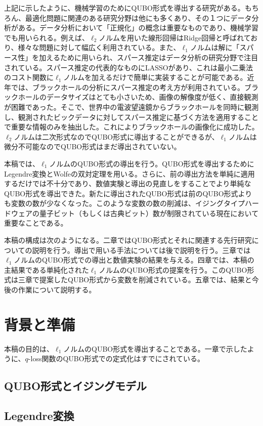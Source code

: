 \documentclass[fp,twocolumn]{jpsj3}
\begin{document}
上記に示したように、機械学習のためにQUBO形式を導出する研究がある。もちろん、最適化問題に関連のある研究分野は他にも多くあり、その１つにデータ分析がある。データ分析において「正規化」の概念は重要なものであり、機械学習でも用いられる。例えば、$\ell_{2}$ノルムを用いた線形回帰はRidge回帰と呼ばれており、様々な問題に対して幅広く利用されている。また、$\ell_{1}$ノルムは解に「スパース性」を加えるために用いられ、スパース推定はデータ分析の研究分野で注目されている。スパース推定の代表的なものにLASSOがあり、これは最小二乗法のコスト関数に$\ell_{1}$ノルムを加えるだけで簡単に実装することが可能である。近年では、ブラックホールの分析にスパース推定の考え方が利用されている。ブラックホールのデータサイズはとても小さいため、画像の解像度が低く、直接観測が困難であった。そこで、世界中の電波望遠鏡からブラックホールを同時に観測し、観測されたビックデータに対してスパース推定に基づく方法を適用することで重要な情報のみを抽出した。これによりブラックホールの画像化に成功した。$\ell_{2}$ノルムは二次形式なのでQUBO形式に導出することができるが、$\ell_{1}$ノルムは微分不可能なのでQUBO形式はまだ導出されていない。

本稿では、$\ell_{1}$ノルムのQUBO形式の導出を行う。QUBO形式を導出するためにLegendre変換とWolfeの双対定理を用いる。さらに、前の導出方法を単純に適用するだけでは不十分であり、数値実験と導出の見直しをすることでより単純なQUBO形式を導出できた。新たに導出されたQUBO形式は前のQUBO形式よりも変数の数が少なくなった。このような変数の数の削減は、イジングタイプハードウェアの量子ビット（もしくは古典ビット）数が制限されている現在において重要なことである。

本稿の構成は次のようになる。二章ではQUBO形式とそれに関連する先行研究についての説明を行う。導出で用いる手法については後で説明を行う。三章では$\ell_{1}$ノルムのQUBO形式での導出と数値実験の結果を与える。四章では、本稿の主結果である単純化された$\ell_{1}$ノルムのQUBO形式の提案を行う。このQUBO形式は三章で提案したQUBO形式から変数を削減されている。五章では、結果と今後の作業について説明する。

\section{背景と準備}
本稿の目的は、$\ell_{1}$ノルムのQUBO形式を導出することである。一章で示したように、$q$-loss関数のQUBO形式での定式化はすでにされている。

\subsection{QUBO形式とイジングモデル}
\subsection{Legendre変換}
\end{document}
